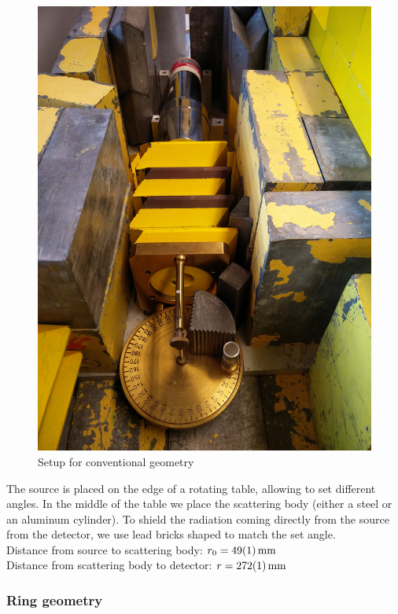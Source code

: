 \documentclass[a4paper,12pt]{article}
\begin{document}
\begin{figure}[H]
	\centering
	\includegraphics[scale=0.1]{../Figures/conv.jpg}
	\caption{Setup for conventional geometry}
	\label{setCalib}
\end{figure}

The source is placed on the edge of a rotating table, allowing to set different angles. In the middle of the table we place the scattering body (either a steel or an aluminum cylinder). To shield the radiation coming directly from the source from the detector, we use lead bricks shaped to match the set angle.\\
Distance from source to scattering body: $r_0 = \SI{49+-1}{mm}$\\
Distance from scattering body to detector: $r = \SI{272+-1}{mm}$\\

\subsubsection{Ring geometry}
\end{document}
